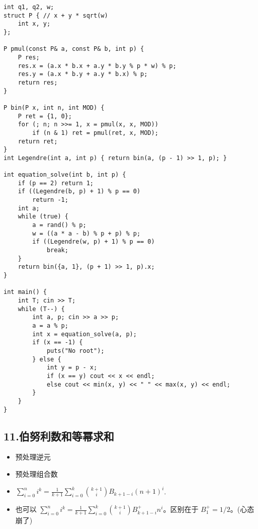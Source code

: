\documentclass[]{article}
\providecommand{\tightlist}{%
  \setlength{\itemsep}{0pt}\setlength{\parskip}{0pt}}
\begin{document}
\begin{verbatim}
int q1, q2, w;
struct P { // x + y * sqrt(w)
    int x, y;
};

P pmul(const P& a, const P& b, int p) {
    P res;
    res.x = (a.x * b.x + a.y * b.y % p * w) % p;
    res.y = (a.x * b.y + a.y * b.x) % p;
    return res;
}

P bin(P x, int n, int MOD) {
    P ret = {1, 0};
    for (; n; n >>= 1, x = pmul(x, x, MOD))
        if (n & 1) ret = pmul(ret, x, MOD);
    return ret;
}
int Legendre(int a, int p) { return bin(a, (p - 1) >> 1, p); }

int equation_solve(int b, int p) {
    if (p == 2) return 1;
    if ((Legendre(b, p) + 1) % p == 0)
        return -1;
    int a;
    while (true) {
        a = rand() % p;
        w = ((a * a - b) % p + p) % p;
        if ((Legendre(w, p) + 1) % p == 0)
            break;
    }
    return bin({a, 1}, (p + 1) >> 1, p).x;
}

int main() {
    int T; cin >> T;
    while (T--) {
        int a, p; cin >> a >> p;
        a = a % p;
        int x = equation_solve(a, p);
        if (x == -1) {
            puts("No root");
        } else {
            int y = p - x;
            if (x == y) cout << x << endl;
            else cout << min(x, y) << " " << max(x, y) << endl;
        }
    }
}
\end{verbatim}

\hypertarget{ux4f2fux52aaux5229ux6570ux548cux7b49ux5e42ux6c42ux548c}{%
\subsection{11.伯努利数和等幂求和}\label{ux4f2fux52aaux5229ux6570ux548cux7b49ux5e42ux6c42ux548c}}

\begin{itemize}
\tightlist
\item
  预处理逆元
\item
  预处理组合数
\item
  \(\sum_{i=0}^n i^k = \frac{1}{k+1} \sum_{i=0}^k \binom{k+1}{i} B_{k+1-i} (n+1)^i\).
\item
  也可以
  \(\sum_{i=0}^n i^k = \frac{1}{k+1} \sum_{i=0}^k \binom{k+1}{i} B^+_{k+1-i} n^i\)。区别在于
  \(B^+_1 =1/2\)。(心态崩了)
\end{itemize}
\end{document}
